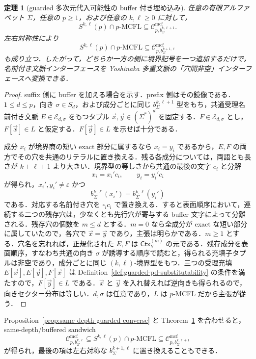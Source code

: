 \documentclass[11pt,a4paper]{ltjsarticle}
\numberwithin{equation}{section}
\theoremstyle{plain}
\newtheorem{theorem}{定理}[section]
\theoremstyle{definition}
\theoremstyle{remark}
\newcommand{\Cmcf}[2]{\mathcal{C}^{\mathrm{mcf}}_{#1,#2}}
\newcommand{\tuple}[1]{\vec{#1}}
\newcommand{\blank}{\square}
\newcommand{\eps}{\varepsilon}
\begin{document}
\begin{theorem}[guarded 多次元代入可能性の buffer 付き埋め込み]
\label{thm:guarded-buffered-embedding}
任意の有限アルファベット \(\Sigma\)，任意の \(p\ge1\)，および任意の
\(k,\ell\ge0\) に対して，
\[
  S^{k,\ell}(p)\cap p\text{-}\mathrm{MCFL}
  \subseteq
  \Cmcf{p}{b_\Sigma^{k,\ell+1}}.
\]
左右対称性により
\[
  S^{k,\ell}(p)\cap p\text{-}\mathrm{MCFL}
  \subseteq
  \Cmcf{p}{b_\Sigma^{k+1,\ell}}
\]
も成り立つ．したがって，どちらか一方の側に境界記号を一つ追加するだけで，名前付き文脈インターフェースを Yoshinaka 多重文脈の「穴間非空」インターフェースへ変換できる．
\end{theorem}

\begin{proof}
suffix 側に buffer を加える場合を示す．prefix 側はその鏡像である．\(1\le d\le p\)，向き \(\sigma\in S_d\)，および成分ごとに同じ \(b_\Sigma^{k,\ell+1}\) 型をもち，共通受理名前付き文脈 \(E\in\mathcal E_{d,\sigma}\) をもつタプル \(\tuple x,\tuple y\in(\Sigma^*)^d\) を固定する．\(F\in\mathcal E_{d,\sigma}\) とし，\(F[\tuple x]\in L\) と仮定する．\(F[\tuple y]\in L\) を示せば十分である．

成分 \(x_i\) が境界商の短い exact 部分に属するなら \(x_i=y_i\) であるから，\(E,F\) の両方でその穴を共通のリテラルに置き換える．残る各成分については，両語とも長さが \(k+\ell+1\) より大きい．境界型の等しさから共通の最後の文字 \(c_i\) と分解
\[
  x_i=x_i'c_i,\qquad y_i=y_i'c_i
\]
が得られ，\(x_i',y_i'\ne\eps\) かつ
\[
  b_\Sigma^{k,\ell}(x_i')=b_\Sigma^{k,\ell}(y_i')
\]
である．対応する名前付き穴を \(\blank_i c_i\) で置き換える．すると表面順序において，連続する二つの残存穴は，少なくとも先行穴が寄与する buffer 文字によって分離される．残存穴の個数を \(m\le d\) とする．\(m=0\) なら全成分が exact な短い部分に属していたので，各穴で \(\tuple x=\tuple y\) であり，主張は明らかである．\(m\ge1\) とする．穴名を忘れれば，正規化された \(E,F\) は \(\mathsf{Ctx}_{\mathrm Y}^{(m)}\) の元である．残存成分を表面順序，すなわち共通の向き \(\sigma\) が誘導する順序で読むと，得られる充填子タプルは非空であり，成分ごとに同じ \((k,\ell)\)-境界型をもつ．三つの受理充填
\(E[\tuple x],E[\tuple y],F[\tuple x]\) は Definition~\ref{def:guarded-pd-substitutability} の条件を満たすので，\(F[\tuple y]\in L\) である．\(\tuple x\) と \(\tuple y\) を入れ替えれば逆向きも得られるので，向きセクター分布は等しい．\(d,\sigma\) は任意であり，\(L\) は \(p\)-MCFL だから主張が従う．
\end{proof}

Proposition~\ref{prop:same-depth-guarded-converse} と Theorem~\ref{thm:guarded-buffered-embedding} を合わせると，same-depth/buffered sandwich
\[
  \Cmcf{p}{b_\Sigma^{k,\ell}}
  \subseteq
  S^{k,\ell}(p)\cap p\text{-}\mathrm{MCFL}
  \subseteq
  \Cmcf{p}{b_\Sigma^{k,\ell+1}}
\]
が得られ，最後の項は左右対称な $b_\Sigma^{k+1,\ell}$ に置き換えることもできる．
\end{document}
